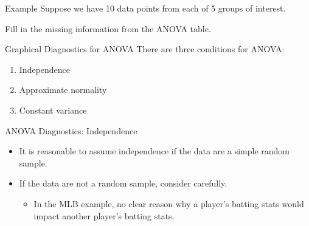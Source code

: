 \begin{frame}{Example}
    Suppose we have 10 data points from each of 5 groups of interest.
    \begin{table}[]
    \end{table}
    Fill in the missing information from the ANOVA table.
\end{frame}

\begin{frame}{Graphical Diagnostics for ANOVA}
    There are three conditions for ANOVA:
    \begin{enumerate}
        \item Independence
        \item Approximate normality
        \item Constant variance
    \end{enumerate}
\end{frame}

\begin{frame}{ANOVA Diagnostics: Independence}
    \begin{itemize}
        \item It is reasonable to assume independence if the data are a simple random sample.
        \item If the data are not a random sample, consider carefully.
        \begin{itemize}
            \item In the MLB example, no clear reason why a player's batting stats would impact another player's batting stats.
        \end{itemize}
    \end{itemize}
\end{frame}

